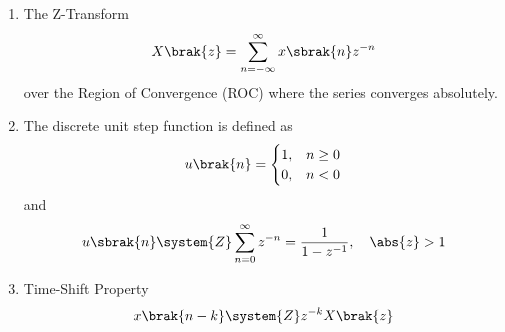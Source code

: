 \begin{enumerate}[label=\thesubsection.\arabic*, ref=\thesubsection.\theenumi,itemsep=0pt]
\begin{itemize}
\item In multi-component conservation and stoichiometric balances, the conservation of elemental species across reactant and product streams is represented by:
\begin{align}
\vec{A}_{\text{reactants}} \vec{x}_{\text{reactants}} = \vec{A}_{\text{products}} \vec{x}_{\text{products}}
\end{align}
Combining both sides into a single stoichiometric matrix yields the homogeneous system:
\begin{align}
\sbrak{\vec{A}_{\text{reactants}} \quad -\vec{A}_{\text{products}}} \vec{x} = \vec{0} \label{eq:EE26BTECH11213-stoich_matrix_homo}
\end{align}
When boundary parameters or specific yields fix certain degrees of freedom (such as basis mole values and yield coefficients), the homogeneous system reduces to a deterministic non-homogeneous matrix equation $\vec{A}\vec{x} = \vec{b}$ that can be solved directly via row operations or symbolic matrix inversion.
\end{itemize}
\fi
\item The Z-Transform
\begin{align}
X\brak{z} =  \sum_{n=-\infty}^{\infty} x\sbrak{n} z^{-n} 
\label{eq:EE26BTECH11213-z_transform_def}
\end{align}
over the Region of Convergence (ROC) where the series converges absolutely.
%
\item 
The discrete unit step function  is defined as
\begin{align}
u\brak{n} = \begin{cases}
1, & n \ge 0 \\
0, & n < 0
\end{cases} \label{eq:EE26BTECH11213-discrete_unit_step}
\end{align}
and 
\begin{align}
	u\sbrak{n} \system{Z} \sum_{n=0}^{\infty} z^{-n} = \frac{1}{1 - z^{-1}}, \quad \abs{z} > 1 \label{eq:EE26BTECH11213-z_step_transform}
\end{align}
%
\item Time-Shift Property
\begin{align}
	x\brak{n - k} \system{Z} z^{-k} X\brak{z} 
	\label{eq:EE26BTECH11213-z_shift_property}
\end{align}


\end{enumerate}
